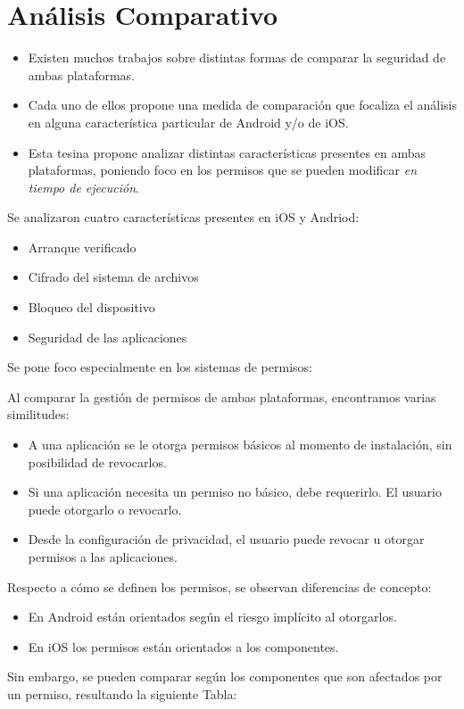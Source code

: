 \chapter{Análisis Comparativo}
 \begin{itemize}
  \item Existen muchos trabajos sobre distintas formas de comparar la seguridad de ambas plataformas.
  \item Cada uno de ellos propone una medida de comparación que focaliza el análisis en alguna característica particular de Android y/o de iOS.
  \item Esta tesina propone analizar distintas características presentes en ambas plataformas,  poniendo foco en {los permisos que se pueden modificar \emph{en tiempo de ejecución}}.
 \end{itemize}
 Se analizaron cuatro características presentes en iOS y Andriod:
 \begin{itemize}
  \item Arranque verificado
  \item Cifrado del sistema de archivos
  \item Bloqueo del dispositivo
  \item Seguridad de las aplicaciones
 \end{itemize}
Se pone foco especialmente en los sistemas de permisos:

Al comparar la gestión de permisos de ambas plataformas, encontramos varias similitudes:
 \begin{itemize}
  \item A una aplicación se le otorga permisos básicos al momento de instalación, sin posibilidad de revocarlos.
  \item Si una aplicación necesita un permiso no básico, debe requerirlo. El usuario puede otorgarlo o revocarlo.
  \item Desde la configuración de privacidad, el usuario puede revocar u otorgar permisos a las aplicaciones.
 \end{itemize}

Respecto a cómo se definen los permisos, se observan diferencias de concepto:
 \begin{itemize}
  \item En Android están orientados según el riesgo implícito al otorgarlos.
  \item En iOS los permisos están orientados a los componentes.
 \end{itemize} 
 
Sin embargo, se pueden comparar según los componentes que son afectados por un permiso,  resultando la siguiente Tabla:

